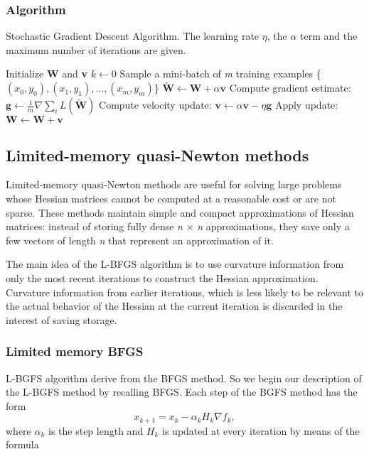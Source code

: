 \subsubsection{Algorithm}
\begin{algorithm}[H]
	\caption{Stochastic Gradient Descent Algorithm. The learning rate $\eta$, the $\alpha$ term and the maximum number of iterations are given.}
	\label{alg:sgd}
	\begin{algorithmic}[1]
		\State Initialize \textbf{W} and \textbf{v}
		\State $k \gets 0$
		\State Sample a mini-batch of \textit{m} training examples \{\textit{$(x_0,y_0),(x_1,y_1),...,(x_m,y_m)$}\}
		\State $\tilde{\textbf{W}} \gets \textbf{W} + \alpha \textbf{v}$
		\EndIf
		\State Compute gradient estimate: $\textbf{g} \gets \frac {1}{m} \nabla \sum_i\textit{L}(\tilde{\textbf{W}})$
		\State Compute velocity update: $\textbf{v} \gets \alpha \textbf{v} - \eta \textbf{g}$
		\State Apply update: $\textbf{W} \gets \textbf{W} + \textbf{v}$
		\EndWhile
		\EndProcedure
	\end{algorithmic}
\end{algorithm}

\subsection{Limited-memory quasi-Newton methods}
Limited-memory quasi-Newton methods are useful for solving large problems whose Hessian matrices cannot be computed at a reasonable cost or are not sparse.  
These methods maintain simple and compact approximations of Hessian matrices: instead of storing fully dense \textit{n} $\times$ \textit{n} approximations, they save only a few vectors of length \textit{n} that represent an approximation of it. 
 
The main idea of the L-BFGS algorithm is to use curvature information from only the most recent iterations to construct the Hessian approximation. Curvature information from earlier iterations, which is less likely to be relevant to the actual behavior of the Hessian at the current iteration is discarded in the interest of saving storage. 

\subsubsection{Limited memory BFGS}
L-BGFS algorithm derive from the BFGS method. So we begin our description of the L-BGFS method by recalling BFGS. 
Each step of the BGFS method has the form
\begin{equation}
\label{stepBFGS}
x_{k+1}=x_{k}-\alpha_{k}H_{k}\nabla f_{k} ,
\end{equation}
where $\alpha_{k}$ is the step length and $H_{k}$
is updated at every iteration by means of the formula

